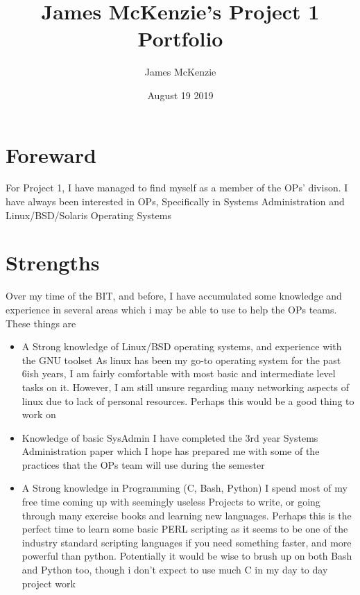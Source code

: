 \documentclass{article}
\begin{document}
\title{James McKenzie's Project 1 Portfolio}
\author{James McKenzie}
\date{August 19 2019}
\maketitle


\section*{Foreward}
For Project 1, I have managed to find myself as a member of the OPs' divison. I have always been interested in OPs, Specifically in Systems Administration and Linux/BSD/Solaris Operating Systems
\section*{Strengths}
Over my time of the BIT, and before, I have accumulated some knowledge and experience in several areas which i may be able to use to help the OPs teams. These things are
\begin{itemize}
\item A Strong knowledge of Linux/BSD operating systems, and experience with the GNU toolset\newline
	As linux has been my go-to operating system for the past 6ish years, I am fairly comfortable with most basic and intermediate level tasks on it. However, I am still unsure regarding many networking aspects of linux due to lack of personal resources. Perhaps this would be a good thing to work on
\item Knowledge of basic SysAdmin\newline 
	I have completed the 3rd year Systems Administration paper which I hope has prepared me with some of the practices that the OPs team will use during the semester
\item A Strong knowledge in Programming (C, Bash, Python) \newline
	I spend most of my free time coming up with seemingly useless Projects to write, or going through many exercise books and learning new languages. Perhaps this is the perfect time to learn some basic PERL scripting as it seems to be one of the industry standard scripting languages if you need something faster, and more powerful than python. Potentially it would be wise to brush up on both Bash and Python too, though i don't expect to use much C in my day to day project work
\end{itemize}
\end{document}
